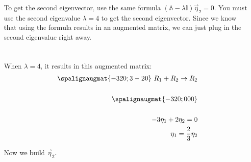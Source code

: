 \documentclass{jhwhw}
\begin{document}
To get the second eigenvector, use the same formula \((\mathbb{A} - \lambda\mathbb{I})\vec\eta_2 = 0\). You must use the second eigenvalue \(\lambda = 4\) to get the second eigenvector. Since we know that using the formula results in an augmented matrix, we can just plug in the second eigenvalue right away. 
\\ \\ \\
When \(\lambda = 4\), it results in this augmented matrix:
\\
\begin{align*}
    \spalignaugmat{ -3 2 0; 3 -2 0} \text{ } R_1 + R_2 \rightarrow R_2 \\ \\
    \spalignaugmat{-3 2 0; 0 0 0} \\ \\
    -3\eta_1 + 2\eta_2 = 0 \\
    \eta_1 = \frac{2}{3}\eta_2 \\
\end{align*}

Now we build \(\vec\eta_2\).
\end{document}
